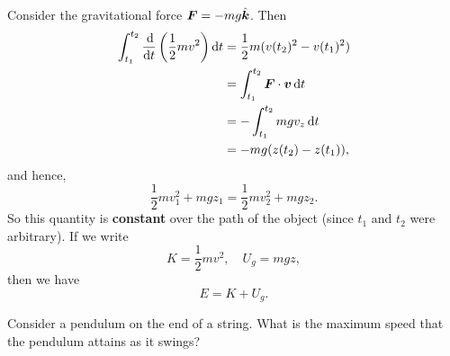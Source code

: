 \documentclass[../classical_mechanics.tex]{subfiles}
\begin{document}
        \paragraph{}
        Consider the gravitational force $\boldsymbol{F}=-mg\hat{\boldsymbol{k}}$. Then
        \begin{align}
            \int_{t_1}^{t_2}\dv{}{t}\left(\frac{1}{2}mv^2\right)\dd{t}&=\frac{1}{2}m(v(t_2)^2-v(t_1)^2)\\
            &=\int_{t_1}^{t_2}\vec{F}\cdot\vec{v}\dd{t}\\
            &=-\int_{t_1}^{t_2}mgv_z\dd{t}\\
            &=-mg(z(t_2)-z(t_1)),
        \end{align}
        and hence,
        \begin{equation}
            \frac{1}{2}mv_1^2+mgz_1=\frac{1}{2}mv_2^2+mgz_2.
        \end{equation}
        So this quantity is \textbf{constant} over the path of the object (since $t_1$ and $t_2$ were arbitrary).
        If we write
        \begin{equation}
            K=\frac{1}{2}mv^2,\quad U_g=mgz,
        \end{equation}
        then we have
        \begin{equation}
            E=K+U_g.
        \end{equation}
        \begin{example}
            Consider a pendulum on the end of a string. What is the maximum speed that the pendulum attains as it swings?
        \end{example}
\end{document}
